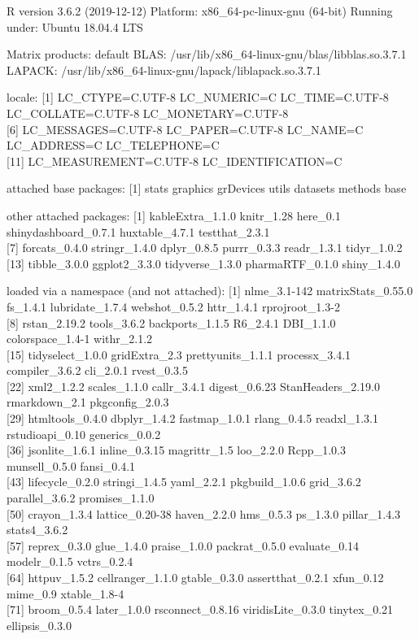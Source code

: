 \documentclass[]{article}
\begin{document}
R version 3.6.2 (2019-12-12) Platform: x86\_64-pc-linux-gnu (64-bit)
Running under: Ubuntu 18.04.4 LTS

Matrix products: default BLAS:
/usr/lib/x86\_64-linux-gnu/blas/libblas.so.3.7.1 LAPACK:
/usr/lib/x86\_64-linux-gnu/lapack/liblapack.so.3.7.1

locale: {[}1{]} LC\_CTYPE=C.UTF-8 LC\_NUMERIC=C LC\_TIME=C.UTF-8
LC\_COLLATE=C.UTF-8 LC\_MONETARY=C.UTF-8\\
{[}6{]} LC\_MESSAGES=C.UTF-8 LC\_PAPER=C.UTF-8 LC\_NAME=C LC\_ADDRESS=C
LC\_TELEPHONE=C\\
{[}11{]} LC\_MEASUREMENT=C.UTF-8 LC\_IDENTIFICATION=C

attached base packages: {[}1{]} stats graphics grDevices utils datasets
methods base

other attached packages: {[}1{]} kableExtra\_1.1.0 knitr\_1.28 here\_0.1
shinydashboard\_0.7.1 huxtable\_4.7.1 testthat\_2.3.1\\
{[}7{]} forcats\_0.4.0 stringr\_1.4.0 dplyr\_0.8.5 purrr\_0.3.3
readr\_1.3.1 tidyr\_1.0.2\\
{[}13{]} tibble\_3.0.0 ggplot2\_3.3.0 tidyverse\_1.3.0 pharmaRTF\_0.1.0
shiny\_1.4.0

loaded via a namespace (and not attached): {[}1{]} nlme\_3.1-142
matrixStats\_0.55.0 fs\_1.4.1 lubridate\_1.7.4 webshot\_0.5.2
httr\_1.4.1 rprojroot\_1.3-2\\
{[}8{]} rstan\_2.19.2 tools\_3.6.2 backports\_1.1.5 R6\_2.4.1 DBI\_1.1.0
colorspace\_1.4-1 withr\_2.1.2\\
{[}15{]} tidyselect\_1.0.0 gridExtra\_2.3 prettyunits\_1.1.1
processx\_3.4.1 compiler\_3.6.2 cli\_2.0.1 rvest\_0.3.5\\
{[}22{]} xml2\_1.2.2 scales\_1.1.0 callr\_3.4.1 digest\_0.6.23
StanHeaders\_2.19.0 rmarkdown\_2.1 pkgconfig\_2.0.3\\
{[}29{]} htmltools\_0.4.0 dbplyr\_1.4.2 fastmap\_1.0.1 rlang\_0.4.5
readxl\_1.3.1 rstudioapi\_0.10 generics\_0.0.2\\
{[}36{]} jsonlite\_1.6.1 inline\_0.3.15 magrittr\_1.5 loo\_2.2.0
Rcpp\_1.0.3 munsell\_0.5.0 fansi\_0.4.1\\
{[}43{]} lifecycle\_0.2.0 stringi\_1.4.5 yaml\_2.2.1 pkgbuild\_1.0.6
grid\_3.6.2 parallel\_3.6.2 promises\_1.1.0\\
{[}50{]} crayon\_1.3.4 lattice\_0.20-38 haven\_2.2.0 hms\_0.5.3
ps\_1.3.0 pillar\_1.4.3 stats4\_3.6.2\\
{[}57{]} reprex\_0.3.0 glue\_1.4.0 praise\_1.0.0 packrat\_0.5.0
evaluate\_0.14 modelr\_0.1.5 vctrs\_0.2.4\\
{[}64{]} httpuv\_1.5.2 cellranger\_1.1.0 gtable\_0.3.0 assertthat\_0.2.1
xfun\_0.12 mime\_0.9 xtable\_1.8-4\\
{[}71{]} broom\_0.5.4 later\_1.0.0 rsconnect\_0.8.16 viridisLite\_0.3.0
tinytex\_0.21 ellipsis\_0.3.0
\end{document}

